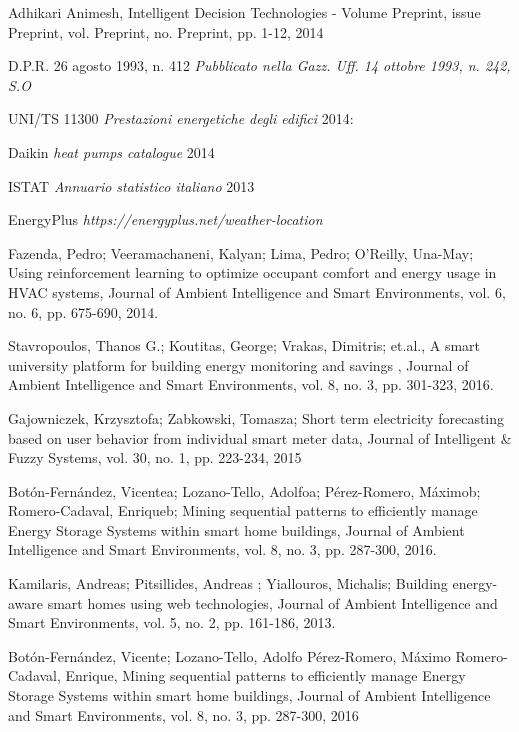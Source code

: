 \documentclass[letterpaper, 10 pt, conference]{ieeeconf}
\begin{document}
\begin{thebibliography}{1}
	
	 Adhikari Animesh, Intelligent Decision Technologies - Volume Preprint, issue Preprint,  vol. Preprint, no. Preprint, pp. 1-12, 2014 
	
	 D.P.R. 26 agosto 1993, n. 412 {\em Pubblicato nella Gazz. Uff. 14 ottobre 1993, n. 242, S.O}
	
	 UNI/TS 11300 {\em Prestazioni energetiche degli edifici} 2014:
		
	 Daikin {\em heat pumps catalogue} 2014
	
	 ISTAT {\em Annuario statistico italiano} 2013
	
	 EnergyPlus {\em https://energyplus.net/weather-location}
	
	 Fazenda, Pedro; Veeramachaneni, Kalyan; Lima, Pedro; O'Reilly, Una-May; Using reinforcement learning to optimize occupant comfort and energy usage in HVAC systems, Journal of Ambient Intelligence and Smart Environments, vol. 6, no. 6, pp. 675-690, 2014.
	
	 Stavropoulos, Thanos G.;  Koutitas, George; Vrakas, Dimitris; et.al., A smart university platform for building energy monitoring and savings , Journal of Ambient Intelligence and Smart Environments, vol. 8, no. 3, pp. 301-323, 2016. 
	
	 Gajowniczek, Krzysztofa; Zabkowski, Tomasza; Short term electricity forecasting based on user behavior from individual smart meter data,  Journal of Intelligent \& Fuzzy Systems, vol. 30, no. 1, pp. 223-234, 2015
	
	 Botón-Fernández, Vicentea; Lozano-Tello, Adolfoa;  Pérez-Romero, Máximob; Romero-Cadaval, Enriqueb; Mining sequential patterns to efficiently manage Energy Storage Systems within smart home buildings, Journal of Ambient Intelligence and Smart Environments, vol. 8, no. 3, pp. 287-300, 2016.
	
	 Kamilaris, Andreas; Pitsillides, Andreas ; Yiallouros, Michalis; Building energy-aware smart homes using web technologies, Journal of Ambient Intelligence and Smart Environments, vol. 5, no. 2, pp. 161-186, 2013.
	
	 Botón-Fernández, Vicente; Lozano-Tello, Adolfo Pérez-Romero, Máximo Romero-Cadaval, Enrique, Mining sequential patterns to efficiently manage Energy Storage Systems within smart home buildings, Journal of Ambient Intelligence and Smart Environments, vol. 8, no. 3, pp. 287-300, 2016
	
\end{thebibliography}
\end{document}
